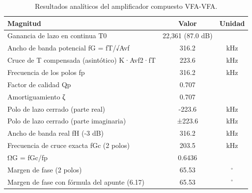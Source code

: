 \begin{table}[H]
\centering
\begin{tabular}{lcc}
\toprule
Magnitud & Valor & Unidad \\
\midrule
Ganancia de lazo en continua T0 & 22,361  (87.0 dB) &  \\
Ancho de banda potencial fG = fT/√Avf & 316.2 & kHz \\
Cruce de T compensada (asintótico) K·Avf2·fT & 223.6 & kHz \\
Frecuencia de los polos fp & 316.2 & kHz \\
Factor de calidad Qp & 0.707 &  \\
Amortiguamiento ζ & 0.707 &  \\
Polo de lazo cerrado (parte real) & -223.6 & kHz \\
Polo de lazo cerrado (parte imaginaria) & ±223.6 & kHz \\
Ancho de banda real fH (-3 dB) & 316.2 & kHz \\
Frecuencia de cruce exacta fGc (2 polos) & 203.5 & kHz \\
ΩG = fGc/fp & 0.6436 &  \\
Margen de fase (2 polos) & 65.53 & $^\circ$ \\
Margen de fase con fórmula del apunte (6.17) & 65.53 & $^\circ$ \\
\bottomrule
\end{tabular}
\caption{Resultados analíticos del amplificador compuesto VFA-VFA.}
\label{tab:analitica_c1}
\end{table}